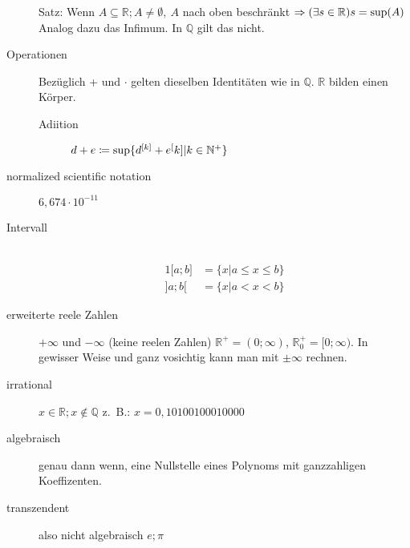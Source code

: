 \begin{description}
    Satz: Wenn $A \subseteq \mathbb{R}; A \not = \emptyset,\ A$ nach oben beschränkt $\Rightarrow (\exists s \in \mathbb{R}) s = \operatorname{sup}(A)$ Analog dazu das Infimum.
    In $\mathbb{Q}$ gilt das nicht.

    \item[Operationen] Bezüglich + und $\cdot$ gelten dieselben Identitäten wie in $\mathbb{Q}$. $\mathbb{R}$ bilden einen Körper.
    \begin{description}
        \item[Adiition] $d + e \coloneqq \operatorname{sup} \lbrace d^{[k]} + e^[k] | k \in \mathbb{N}^+ \rbrace$
        \item[]
    \end{description}
    \item[normalized scientific notation] $6,674 \cdot 10^{-11}$
    \item[Intervall] \
    \begin{alignat*}{1}
        \lbrack a; b \rbrack & = \lbrace x | a \leq x\leq b \rbrace \\
        \rbrack a; b \lbrack & = \lbrace x | a < x < b \rbrace
    \end{alignat*}
    \item[erweiterte reele Zahlen] $+\infty$ und $-\infty$ (keine reelen Zahlen) $\mathbb{R}^+ = (0; \infty)$, $\mathbb{R}_0^+=\lbrack 0 ; \infty)$.
    In gewisser Weise und ganz vosichtig kann man mit $\pm \infty$ rechnen.
    \item[irrational] $x \in \mathbb{R}; x \not \in \mathbb{Q}$ z.~B.: $x = 0,10100100010000$
    \item[algebraisch] genau dann wenn, eine Nullstelle eines Polynoms mit ganzzahligen Koeffizenten.
    \item[transzendent] also nicht algebraisch $e; \pi$
\end{description}
